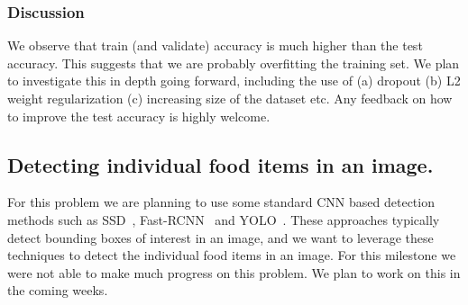 \subsubsection{Discussion}
\label{subsubsec:pb1discussion}

We observe that train (and validate) accuracy is much higher than the test accuracy. This suggests that we are probably overfitting the training set. We plan to investigate this in depth going forward, including the use of (a) dropout (b)  L2 weight regularization  (c) increasing size of the dataset etc. Any feedback on how to improve the test accuracy is highly welcome.

\subsection{Detecting individual food items in an image.}

For this problem we are planning to use some standard CNN based detection methods such as SSD~\cite{liu2016ssd}, Fast-RCNN~\cite{ren2015faster} and YOLO~\cite{redmon2016you}. These approaches typically detect bounding boxes of interest in an image, and we want to leverage these techniques to detect the individual food items in an image. For this milestone we were not able to make much progress on this problem. We plan to work on this in the coming weeks. 


